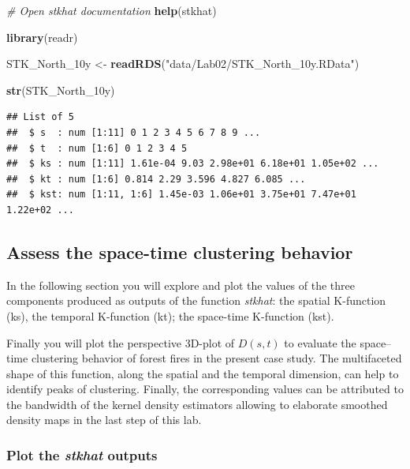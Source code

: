 \documentclass[
]{book}
\newenvironment{Shaded}{\begin{snugshade}}{\end{snugshade}}
\newcommand{\CommentTok}[1]{\textcolor[rgb]{0.56,0.35,0.01}{\textit{#1}}}
\newcommand{\FunctionTok}[1]{\textcolor[rgb]{0.13,0.29,0.53}{\textbf{#1}}}
\newcommand{\NormalTok}[1]{#1}
\newcommand{\OtherTok}[1]{\textcolor[rgb]{0.56,0.35,0.01}{#1}}
\newcommand{\StringTok}[1]{\textcolor[rgb]{0.31,0.60,0.02}{#1}}
\begin{document}
\begin{Shaded}
\begin{Highlighting}[]
\CommentTok{\# Open stkhat documentation}
\FunctionTok{help}\NormalTok{(stkhat)}
\end{Highlighting}
\end{Shaded}

\begin{Shaded}
\begin{Highlighting}[]
\FunctionTok{library}\NormalTok{(readr)}

\NormalTok{STK\_North\_10y }\OtherTok{\textless{}{-}} \FunctionTok{readRDS}\NormalTok{(}\StringTok{"data/Lab02/STK\_North\_10y.RData"}\NormalTok{)}

\FunctionTok{str}\NormalTok{(STK\_North\_10y)}
\end{Highlighting}
\end{Shaded}

\begin{verbatim}
## List of 5
##  $ s  : num [1:11] 0 1 2 3 4 5 6 7 8 9 ...
##  $ t  : num [1:6] 0 1 2 3 4 5
##  $ ks : num [1:11] 1.61e-04 9.03 2.98e+01 6.18e+01 1.05e+02 ...
##  $ kt : num [1:6] 0.814 2.29 3.596 4.827 6.085 ...
##  $ kst: num [1:11, 1:6] 1.45e-03 1.06e+01 3.75e+01 7.47e+01 1.22e+02 ...
\end{verbatim}

\hypertarget{assess-the-space-time-clustering-behavior}{%
\subsection{Assess the space-time clustering behavior}\label{assess-the-space-time-clustering-behavior}}

In the following section you will explore and plot the values of the three components produced as outputs of the function \emph{stkhat}: the spatial K-function (ks), the temporal K-function (kt); the space-time K-function (kst).

Finally you will plot the perspective 3D-plot of \(D(s,t)\) to evaluate the space--time clustering behavior of forest fires in the present case study.
The multifaceted shape of this function, along the spatial and the temporal dimension, can help to identify peaks of clustering.
Finally, the corresponding values can be attributed to the bandwidth of the kernel density estimators allowing to elaborate smoothed density maps in the last step of this lab.

\hypertarget{plot-the-stkhat-outputs}{%
\subsubsection{\texorpdfstring{Plot the \emph{stkhat} outputs}{Plot the stkhat outputs}}\label{plot-the-stkhat-outputs}}
\end{document}
